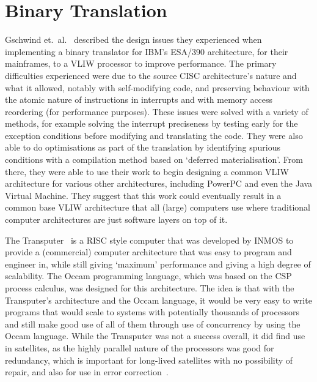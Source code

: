 \section{Binary Translation}

Gschwind et.\ al.~\cite{Gschwind2000BinaryTranslation} described the design
issues they experienced when implementing a binary translator for IBM's ESA/390
architecture, for their mainframes, to a VLIW processor to improve performance.
The primary difficulties experienced were due to the source CISC architecture's
nature and what it allowed, notably with self-modifying code, and preserving
behaviour with the atomic nature of instructions in interrupts and with memory
access reordering (for performance purposes). These issues were solved with a
variety of methods, for example solving the interrupt preciseness by testing
early for the exception conditions before modifying and translating the code.
They were also able to do optimisations as part of the translation by
identifying spurious conditions with a compilation method based on `deferred
materialisation'. From there, they were able to use their work to begin
designing a common VLIW architecture for various other architectures, including
PowerPC and even the Java Virtual Machine. They suggest that this work could
eventually result in a common base VLIW architecture that all (large) computers
use where traditional computer architectures are just software layers on top of
it.

The Transputer~\cite{Whitby1985Transputer} is a RISC style computer that was
developed by INMOS to provide a (commercial) computer architecture that was easy
to program and engineer in, while still giving `maximum' performance and giving
a high degree of scalability. The Occam programming language, which was based on
the CSP process calculus, was designed for this architecture.  The idea is that
with the Transputer's architecture and the Occam language, it would be very easy
to write programs that would scale to systems with potentially thousands of
processors and still make good use of all of them through use of concurrency by
using the Occam language. While the Transputer was not a success overall, it did
find use in satellites, as the highly parallel nature of the processors was good
for redundancy, which is important for long-lived satellites with no possibility
of repair, and also for use in error correction~\cite{Mattos1990Transputer}.

